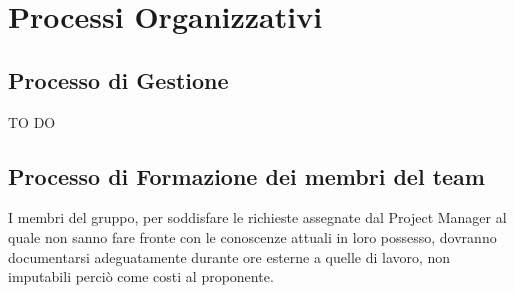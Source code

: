 %
%


\section{Processi Organizzativi}
	\subsection{Processo di Gestione}
TO DO
	
	
	\subsection{Processo di Formazione dei membri del team}
I membri del gruppo, per soddisfare le richieste assegnate dal Project Manager al quale non sanno fare fronte con le conoscenze attuali in loro possesso, dovranno documentarsi adeguatamente durante ore esterne a quelle di lavoro, non imputabili perciò come costi al proponente.